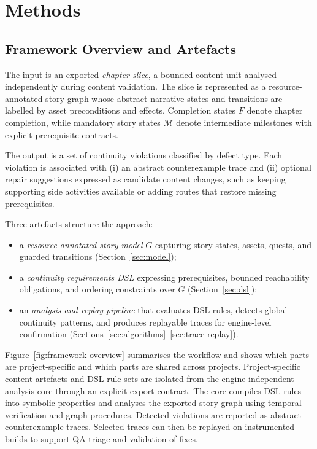 \documentclass[conference]{IEEEtran}
\begin{document}
\section{Methods}
\subsection{Framework Overview and Artefacts}
\label{sec:overview}

The input is an exported \emph{chapter slice}, a bounded content unit
analysed independently during content validation. The slice is represented
as a resource-annotated story graph whose abstract narrative states and
transitions are labelled by asset preconditions and effects. Completion
states $F$ denote chapter completion, while mandatory story states
$\mathcal{M}$ denote intermediate milestones with explicit prerequisite
contracts.

The output is a set of continuity violations classified by defect type.
Each violation is associated with (i) an abstract counterexample trace and
(ii) optional repair suggestions expressed as candidate content changes,
such as keeping supporting side activities available or adding routes
that restore missing prerequisites.

Three artefacts structure the approach:

\begin{itemize}[leftmargin=1.3em]
  \item a \emph{resource-annotated story model} $G$ capturing story
        states, assets, quests, and guarded transitions
        (Section~\ref{sec:model});
  \item a \emph{continuity requirements DSL} expressing prerequisites,
        bounded reachability obligations, and ordering constraints over
        $G$ (Section~\ref{sec:dsl});
  \item an \emph{analysis and replay pipeline} that evaluates DSL rules,
        detects global continuity patterns, and produces replayable
        traces for engine-level confirmation
        (Sections~\ref{sec:algorithms}--\ref{sec:trace-replay}).
\end{itemize}

Figure~\ref{fig:framework-overview} summarises the workflow and shows
which parts are project-specific and which parts are shared across
projects. Project-specific content artefacts and DSL rule
sets are isolated from the engine-independent analysis core through an
explicit export contract. The core compiles DSL rules into symbolic
properties and analyses the exported story graph using temporal
verification and graph procedures. Detected violations are reported as abstract counterexample traces. Selected
traces can then be replayed on instrumented builds to support QA triage and
validation of fixes.
\end{document}
